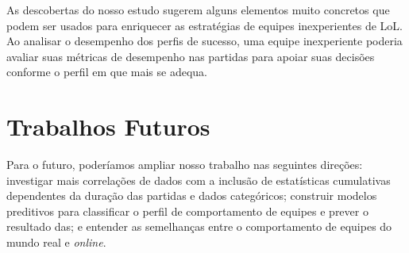 As descobertas do nosso estudo sugerem alguns elementos muito concretos que podem ser usados para enriquecer as estratégias de equipes inexperientes de LoL. Ao analisar o desempenho dos perfis de sucesso, uma equipe inexperiente poderia avaliar suas métricas de desempenho nas partidas para apoiar suas decisões conforme o perfil em que mais se adequa.


\section{Trabalhos Futuros}
Para o futuro, poderíamos ampliar nosso trabalho nas seguintes direções: investigar mais correlações de dados com a inclusão de estatísticas cumulativas dependentes da duração das partidas e dados categóricos; construir modelos preditivos para classificar o perfil de comportamento de equipes e prever o resultado das; e entender as semelhanças entre o comportamento de equipes do mundo real e \textit{online}.

